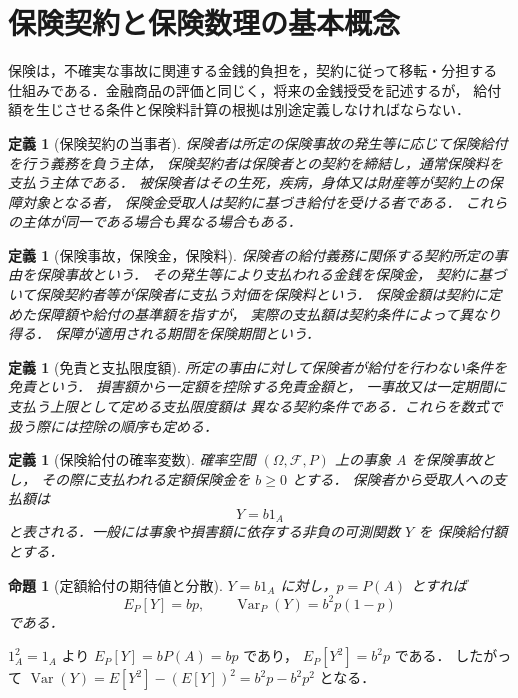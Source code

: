 \documentclass[a5paper,10pt,onecolumn]{jsarticle}
\makeatletter
\theoremstyle{mathnotetheorem}
\newtheorem{definition}[theorem]{定義}
\newtheorem{proposition}[theorem]{命題}
\renewcommand{\proofname}{証明}
\renewenvironment{proof}[1][\proofname]{%
  \par\pushQED{\qed}\normalfont\topsep4\p@\@plus2\p@\relax
  \trivlist\item[\hskip\labelsep\bfseries #1]\ignorespaces
}{\popQED\endtrivlist\@endpefalse}
\makeatother
\begin{document}
\section{保険契約と保険数理の基本概念}

保険は，不確実な事故に関連する金銭的負担を，契約に従って移転・分担する
仕組みである．金融商品の評価と同じく，将来の金銭授受を記述するが，
給付額を生じさせる条件と保険料計算の根拠は別途定義しなければならない．

\begin{definition}[保険契約の当事者]
\emph{保険者}は所定の保険事故の発生等に応じて保険給付を行う義務を負う主体，
\emph{保険契約者}は保険者との契約を締結し，通常保険料を支払う主体である．
\emph{被保険者}はその生死，疾病，身体又は財産等が契約上の保障対象となる者，
\emph{保険金受取人}は契約に基づき給付を受ける者である．
これらの主体が同一である場合も異なる場合もある．
\end{definition}

\begin{definition}[保険事故，保険金，保険料]
保険者の給付義務に関係する契約所定の事由を\emph{保険事故}という．
その発生等により支払われる金銭を\emph{保険金}，
契約に基づいて保険契約者等が保険者に支払う対価を\emph{保険料}という．
\emph{保険金額}は契約に定めた保障額や給付の基準額を指すが，
実際の支払額は契約条件によって異なり得る．
保障が適用される期間を\emph{保険期間}という．
\end{definition}

\begin{definition}[免責と支払限度額]
所定の事由に対して保険者が給付を行わない条件を\emph{免責}という．
損害額から一定額を控除する\emph{免責金額}と，
一事故又は一定期間に支払う上限として定める\emph{支払限度額}は
異なる契約条件である．これらを数式で扱う際には控除の順序も定める．
\end{definition}

\begin{definition}[保険給付の確率変数]
確率空間 $(\Omega,\mathcal F,P)$ 上の事象 $A$ を保険事故とし，
その際に支払われる定額保険金を $b\ge0$ とする．
保険者から受取人への支払額は
\[
 Y=b1_A
\]
と表される．一般には事象や損害額に依存する非負の可測関数 $Y$ を
\emph{保険給付額}とする．
\end{definition}

\begin{proposition}[定額給付の期待値と分散]\label{prop:bernpay}
$Y=b1_A$ に対し，$p=P(A)$ とすれば
\[
 E_P[Y]=bp,\qquad \operatorname{Var}_P(Y)=b^2p(1-p)
\]
である．
\end{proposition}
\begin{proof}
$1_A^2=1_A$ より $E_P[Y]=bP(A)=bp$ であり，
$E_P[Y^2]=b^2p$ である．
したがって $\operatorname{Var}(Y)=E[Y^2]-(E[Y])^2=b^2p-b^2p^2$ となる．
\end{proof}
\end{document}

